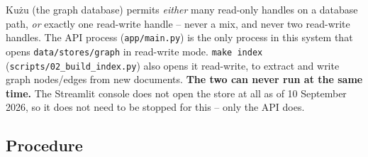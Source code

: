 \documentclass[11pt,a4paper]{article}
\newcommand{\code}[1]{\texttt{\small #1}}
\newcommand{\term}[1]{\textbf{\color{accent}#1}}
\begin{document}
Ku\.zu (the graph database) permits \emph{either} many read-only handles on a
database path, \emph{or} exactly one read-write handle -- never a mix, and
never two read-write handles. The API process (\code{app/main.py}) is the only
process in this system that opens \code{data/stores/graph} in read-write mode.
\code{make index} (\code{scripts/02\_build\_index.py}) also opens it
read-write, to extract and write graph nodes/edges from new documents. \term{The
two can never run at the same time.} The Streamlit console does not open the
store at all as of 10 September 2026, so it does not need to be stopped for
this -- only the API does.

\subsection{Procedure}
\end{document}
